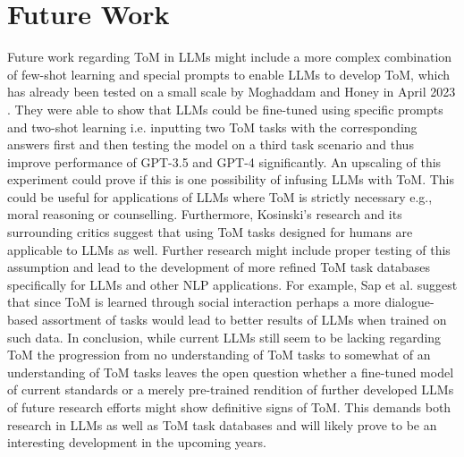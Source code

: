 \section{Future Work}
Future work regarding ToM in LLMs might include a more complex combination of few-shot learning and special prompts to enable LLMs to develop ToM, which has already been tested on a small scale by Moghaddam and Honey in April 2023 \cite{future}. They were able to show that LLMs could be fine-tuned using specific prompts and two-shot learning i.e. inputting two ToM tasks with the corresponding answers first and then testing the model on a third task scenario and thus improve performance of GPT-3.5 and GPT-4 significantly. An upscaling of this experiment could prove if this is one possibility of infusing LLMs with ToM. This could be useful for applications of LLMs where ToM is strictly necessary e.g., moral reasoning or counselling. Furthermore, Kosinski's research and its surrounding critics suggest that using ToM tasks designed for humans are applicable to LLMs as well. Further research might include proper testing of this assumption and lead to the development of more refined ToM task databases specifically for LLMs and other NLP applications. For example, Sap et al. \cite{related} suggest that since ToM is learned through social interaction perhaps a more dialogue-based assortment of tasks would lead to better results of LLMs when trained on such data. In conclusion, while current LLMs still seem to be lacking regarding ToM the progression from no understanding of ToM tasks to somewhat of an understanding of ToM tasks leaves the open question whether a fine-tuned model of current standards or a merely pre-trained rendition of further developed LLMs of future research efforts might show definitive signs of ToM. This demands both research in LLMs as well as ToM task databases and will likely prove to be an interesting development in the upcoming years.